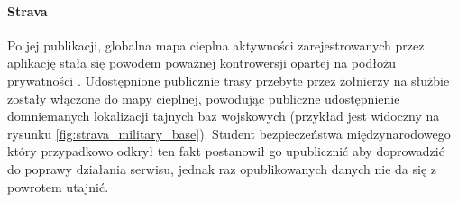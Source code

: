 \paragraph{Strava}
Po jej publikacji, globalna mapa cieplna aktywności zarejestrowanych przez aplikację  stała się powodem poważnej kontrowersji opartej na podłożu prywatności \cite{Strava_Military_Bases}. Udostępnione publicznie trasy przebyte przez żołnierzy na służbie zostały włączone do mapy cieplnej, powodując publiczne udostępnienie domniemanych lokalizacji tajnych baz wojskowych (przykład jest widoczny na rysunku \ref{fig:strava_military_base}). Student bezpieczeństwa międzynarodowego który przypadkowo odkrył ten fakt postanowił go upublicznić aby doprowadzić do poprawy działania serwisu, jednak raz opublikowanych danych nie da się z powrotem utajnić.

\bigskip
{}


